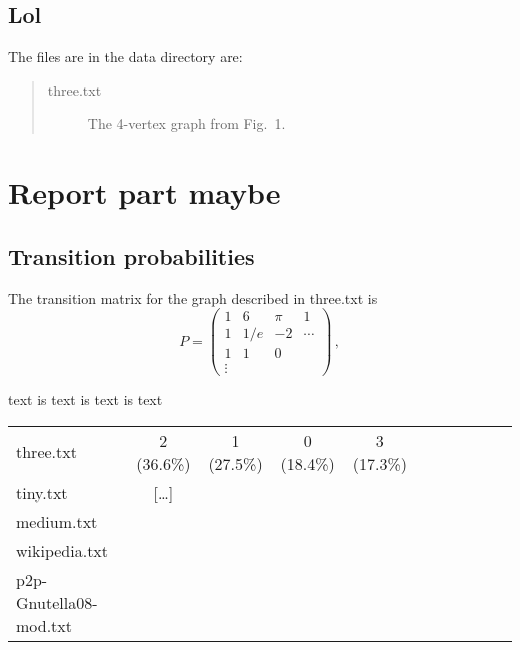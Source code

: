 \documentclass{tufte-handout}
\begin{document}
\subsection{Lol}

The files are in the data directory are:
\begin{quotation}
\begin{description}
\item[three.txt] The 4-vertex graph from Fig.~1.
\end{description}
\end{quotation}

\section{Report part maybe}

\subsection{Transition probabilities}

The transition matrix for the graph described in three.txt
is
\begin{equation*}
P = 
\left(
\begin{array}{cccc}
1 & 6 & \pi & 1\\
1 & 1/e & -2  & \cdots\\
1 & 1 & 0 \\
\vdots
\end{array}
\right)\,,
\end{equation*}

\noindent text is text is text is text

\medskip
\begin{fullwidth}
\small
\begin{tabular}{lcccccccccc}
three.txt & 2 (36.6\%) & 1 (27.5\%) & 0 (18.4\%) & 3 (17.3\%) \\
tiny.txt & [\ldots] &\\
medium.txt &\\
wikipedia.txt & \\
p2p-Gnutella08-mod.txt &
\end{tabular}
\end{fullwidth}
\end{document}
